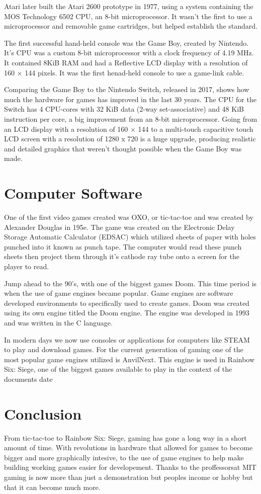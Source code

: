 \documentclass[letterpaper, 10 pt, conference]{IEEEconf}
\begin{document}
Atari later built the Atari 2600 prototype in 1977, using a system containing
the MOS Technology 6502 CPU, an 8-bit microprocessor. It wasn’t the first to 
use a microprocessor and removable game cartridges, but helped establish the 
standard.

The first successful hand-held console was the Game Boy, created by Nintendo. 
It’s CPU was a custom 8-bit microprocessor with a clock frequency of 4.19 MHz.
It contained 8KiB RAM and had a Reflective LCD display with a resolution of 
160 × 144 pixels. It was the first henad-held console to use a game-link cable.

Comparing the Game Boy to the Nintendo Switch, released in 2017, shows how much
the hardware for games has improved in the last 30 years. The CPU for the Switch 
has 4 CPU-cores with 32 KiB data (2-way set-associative) and 48 KiB instruction 
per core, a big improvement from an 8-bit microprocessor. Going from an LCD display
with a resolution of 160 × 144 to a multi-touch capacitive touch LCD screen with
a resolution of 1280 x 720 is a huge upgrade, producing realistic and detailed graphics
that weren’t thought possible when the Game Boy was made.
\section{Computer Software}
One of the first video games created was OXO, or tic-tac-toe and was created by Alexander 
Douglas in 195e. The game was created on the Electronic Delay Storage Automatic Calculator 
(EDSAC) which utilized sheets of paper with holes punched into it known as punch tape. The 
computer would read these punch sheets then project them through it’s cathode ray tube onto 
a screen for the player to read.

Jump ahead to the 90’s, with one of the biggest games Doom. This time period is when the use of 
game engines became popular. Game engines are software developed environments to specifically used 
to create games. Doom was created using its own engine titled the Doom engine. The engine was developed 
in 1993 and was written in the C language. 

In modern days we now use consoles or applications for computers like STEAM to play and download games. 
For the current generation of gaming one of the most popular game engines utilized is AnvilNext. This 
engine is used in Rainbow Six: Siege, one of the biggest games available to play in the context of the 
documents date
\section{Conclusion}

From tic-tac-toe to Rainbow Six: Siege, gaming has gone a long way in a short amount of time.
With revolutions in hardware that allowed for games to become bigger and more graphically intesive,
to the use of game engines to help make building working games easier for developement. Thanks to the 
proffessorsat MIT gaming is now more than just a demonstration but peoples income or hobby but that it
can become much more.
\end{document}
